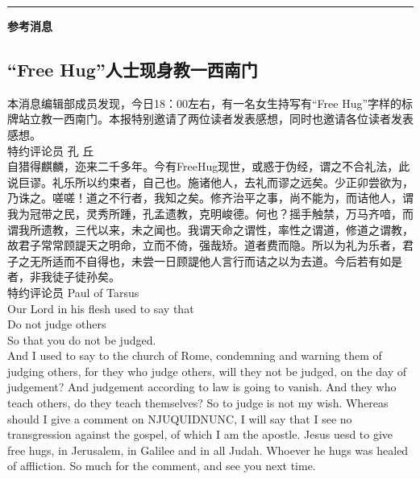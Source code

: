 \documentclass[letterpaper, 12pt]{article}
\begin{document}
\hrule
\vspace{4mm}
\pagebreak
\centerline{\huge\textbf{参考消息}}
\begin{multicols}{2}
\section{“Free Hug”人士现身教一西南门}
本消息编辑部成员发现，今日18：00左右，有一名女生持写有“Free Hug”字样的标牌站立教一西南门。本报特别邀请了两位读者发表感想，同时也邀请各位读者发表感想。\\

特约评论员  孔 丘\\

自猎得麒麟，迩来二千多年。今有FreeHug现世，或惑于伪经，谓之不合礼法，此说巨谬。礼乐所以约束者，自己也。施诸他人，去礼而谬之远矣。少正卯尝欲为，乃诛之。嗟嗟！道之不行者，我知之矣。修齐治平之事，尚不能为，而诘他人，谓我为冠带之民，灵秀所踵，孔孟遗教，克明峻德。何也？摇手触禁，万马齐喑，而谓我所遗教，三代以来，未之闻也。我谓天命之谓性，率性之谓道，修道之谓教，故君子常常顾諟天之明命，立而不倚，强哉矫。道者费而隐。所以为礼为乐者，君子之无所适而不自得也，未尝一日顾諟他人言行而诘之以为去道。今后若有如是者，非我徒子徒孙矣。\\

特约评论员  Paul of Tarsus\\

Our Lord in his flesh used to say that\\
Do not judge others\\
	So that you do not be judged.\\
And I used to say to the church of Rome, condemning and warning them of judging others, for they who judge others, will they not be judged, on the day of judgement? And judgement according to law is going to vanish. And they who teach others, do they teach themselves? So to judge is not my wish. Whereas should I give a comment on NJUQUIDNUNC, I will say that I see no transgression against the gospel, of which I am the apostle. Jesus uesd to give free hugs, in Jerusalem, in Galilee and in all Judah. Whoever he hugs was healed of affliction. So much for the comment, and see you next time.

\end{multicols} 
\end{document}
